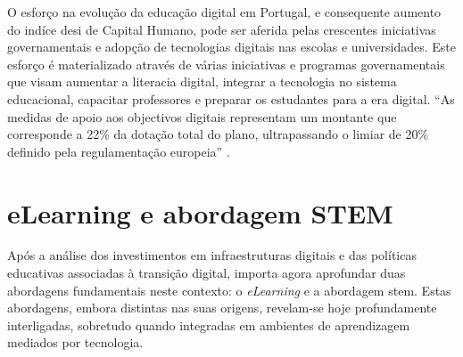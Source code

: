 O esforço na evolução da educação digital em Portugal, e consequente aumento do indíce \acrshort{desi} de Capital Humano,  pode ser aferida pelas crescentes iniciativas governamentais e adopção de tecnologias digitais nas escolas e universidades. Este esforço é materializado através de várias iniciativas e programas governamentais que visam aumentar a literacia digital, integrar a tecnologia no sistema educacional, capacitar professores e preparar os estudantes para a era digital. ``As medidas de apoio aos objectivos digitais representam um montante que corresponde a 22\% da dotação total do plano, ultrapassando o limiar de 20\% definido pela regulamentação europeia'' \cite{Transicaodigitalprr}.

\section{eLearning e abordagem STEM} %
\label{sec:elearningstem}	%

Após a análise dos investimentos em infraestruturas digitais e das políticas educativas associadas à transição digital, importa agora aprofundar duas abordagens fundamentais neste contexto: o \textit{eLearning} e a abordagem \acrshort{stem}. Estas abordagens, embora distintas nas suas origens, revelam-se hoje profundamente interligadas, sobretudo quando integradas em ambientes de aprendizagem mediados por tecnologia.

